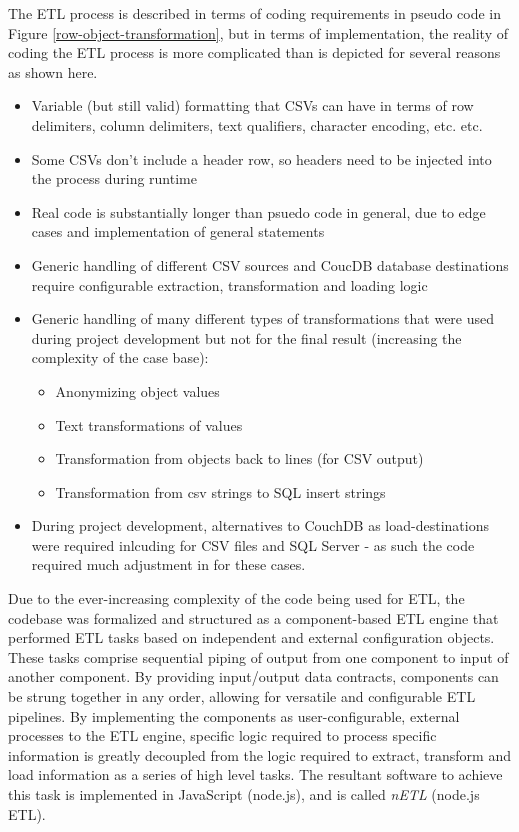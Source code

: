 The ETL process is described in terms of coding requirements in pseudo code in Figure \ref{row-object-transformation}, but in terms of implementation, the reality of coding the ETL process is more complicated than is depicted for several reasons as shown here.

\begin{itemize}
    \item Variable (but still valid) formatting that CSVs can have in terms of row delimiters, column delimiters, text qualifiers, character encoding, etc. etc.
    \item Some CSVs don't include a header row, so headers need to be injected into the process during runtime
    \item Real code is substantially longer than psuedo code in general, due to edge cases and implementation of general statements
    \item Generic handling of different CSV sources and CoucDB database destinations require configurable extraction, transformation and loading logic
    \item Generic handling of many different types of transformations that were used during project development but not for the final result (increasing the complexity of the case base):
          \begin{itemize}
              \item Anonymizing object values
              \item Text transformations of values
              \item Transformation from objects back to lines (for CSV output)
              \item Transformation from csv strings to SQL insert strings
          \end{itemize}
    \item During project development, alternatives to CouchDB as load-destinations were required inlcuding for CSV files and SQL Server - as such the code required much adjustment in for these cases.
\end{itemize}

Due to the ever-increasing complexity of the code being used for ETL, the codebase was formalized and structured as a component-based ETL engine that performed ETL tasks based on independent and external configuration objects. These tasks comprise sequential piping of output from one component to input of another component. By providing input/output data contracts, components can be strung together in any order, allowing for versatile and configurable ETL pipelines. By implementing the components as user-configurable, external processes to the ETL engine, specific logic required to process specific information is greatly decoupled from the logic required to extract, transform and load information as a series of high level tasks. The resultant software to achieve this task is implemented in JavaScript (node.js), and is called \textit{nETL} (node.js ETL).

